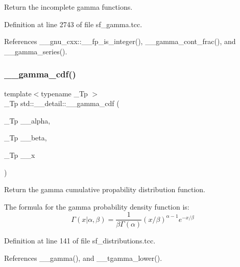 Return the incomplete gamma functions. 



Definition at line 2743 of file sf\+\_\+gamma.\+tcc.



References \+\_\+\+\_\+gnu\+\_\+cxx\+::\+\_\+\+\_\+fp\+\_\+is\+\_\+integer(), \+\_\+\+\_\+gamma\+\_\+cont\+\_\+frac(), and \+\_\+\+\_\+gamma\+\_\+series().

\mbox{\label{namespacestd_1_1____detail_aa4f1cd082a56f66b7ac2f8d805f66a81}} 
\subsubsection{\texorpdfstring{\+\_\+\+\_\+gamma\+\_\+cdf()}{\_\_gamma\_cdf()}}
{\footnotesize\ttfamily template$<$typename \+\_\+\+Tp $>$ \\
\+\_\+\+Tp std\+::\+\_\+\+\_\+detail\+::\+\_\+\+\_\+gamma\+\_\+cdf (\begin{DoxyParamCaption}\item[{\+\_\+\+Tp}]{\+\_\+\+\_\+alpha,  }\item[{\+\_\+\+Tp}]{\+\_\+\+\_\+beta,  }\item[{\+\_\+\+Tp}]{\+\_\+\+\_\+x }\end{DoxyParamCaption})}



Return the gamma cumulative propability distribution function. 

The formula for the gamma probability density function is\+: \[ \Gamma(x|\alpha,\beta) = \frac{1}{\beta\Gamma(\alpha)} (x/\beta)^{\alpha - 1} e^{-x/\beta} \] 

Definition at line 141 of file sf\+\_\+distributions.\+tcc.



References \+\_\+\+\_\+gamma(), and \+\_\+\+\_\+tgamma\+\_\+lower().

\mbox{\label{namespacestd_1_1____detail_a7dc59114c8c223b5570c374a7192d404}} 
